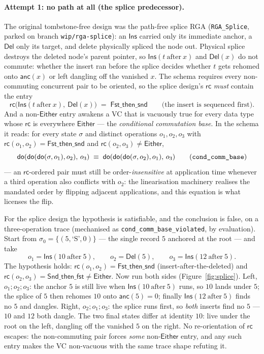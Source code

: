 \documentclass[11pt]{article}
\newcommand{\anc}{\mathsf{anc}}
\newcommand{\rc}{\mathsf{rc}}
\newcommand{\doo}{\mathsf{do}}
\newcommand{\Ins}{\mathsf{Ins}}
\newcommand{\Del}{\mathsf{Del}}
\newcommand{\Either}{\mathsf{Either}}
\begin{document}
\paragraph{Attempt 1: no path at all (the splice predecessor).} The original
tombstone-free design was the path-free splice RGA (\texttt{RGA\_Splice}, parked
on branch \texttt{wip/rga-splice}): an $\Ins$ carried only its immediate anchor,
a $\Del$ only its target, and delete physically spliced the node out. Physical
splice destroys the deleted node's parent pointer, so $\Ins(t\ \text{after}\ x)$
and $\Del(x)$ do not commute: whether the insert ran before the splice decides
whether $t$ gets rehomed onto $\anc(x)$ or left dangling off the vanished $x$.
The schema requires every non-commuting concurrent pair to be oriented, so the
splice design's $\rc$ \emph{must} contain the entry
\[
  \rc\bigl(\Ins(t\ \text{after}\ x),\ \Del(x)\bigr) \;=\; \mathsf{Fst\_then\_snd}
  \qquad\text{(the insert is sequenced first).}
\]
And a non-$\Either$ entry awakens a VC that is vacuously true for every data
type whose $\rc$ is everywhere $\Either$ --- the \emph{conditional commutation
base}. In the schema it reads: for every state $\sigma$ and distinct operations
$o_1, o_2, o_3$ with $\rc(o_1,o_2)=\mathsf{Fst\_then\_snd}$ and
$\rc(o_2,o_3)\neq\Either$,
\[
  \doo(\doo(\doo(\sigma,o_1),o_2),\,o_3)
  \;\equiv\;
  \doo(\doo(\doo(\sigma,o_2),o_1),\,o_3)
  \tag{\texttt{cond\_comm\_base}}
\]
--- an $\rc$-ordered pair must still be order-\emph{insensitive} at application
time whenever a third operation also conflicts with $o_2$: the linearisation
machinery realises the mandated order by flipping adjacent applications, and
this equation is what licenses the flip.

For the splice design the hypothesis is satisfiable, and the conclusion is
false, on a three-operation trace (mechanised as
\texttt{cond\_comm\_base\_violated}, by evaluation). Start from
$\sigma_0 = \{(5, \text{`S'}, 0)\}$ --- the single record $5$ anchored at the
root --- and take
\[
  o_1 = \Ins(10\ \text{after}\ 5), \qquad
  o_2 = \Del(5), \qquad
  o_3 = \Ins(12\ \text{after}\ 5).
\]
The hypothesis holds: $\rc(o_1,o_2)=\mathsf{Fst\_then\_snd}$
(insert-after-the-deleted) and $\rc(o_2,o_3)=\mathsf{Snd\_then\_fst}\neq\Either$.
Now run both sides (Figure~\ref{fig:splice}). Left,
$o_1 ; o_2 ; o_3$: the anchor $5$ is still live when $\Ins(10\ \text{after}\ 5)$
runs, so $10$ lands under $5$; the splice of $5$ then rehomes $10$ onto
$\anc(5)=0$; finally $\Ins(12\ \text{after}\ 5)$ finds no $5$ and dangles.
Right, $o_2 ; o_1 ; o_3$: the splice runs first, so \emph{both} inserts find no
$5$ --- $10$ and $12$ both dangle. The two final states differ at identity
$10$: live under the root on the left, dangling off the vanished $5$ on the
right. No re-orientation of $\rc$ escapes: the non-commuting pair forces
\emph{some} non-$\Either$ entry, and any such entry makes the VC non-vacuous
with the same trace shape refuting it.
\end{document}
